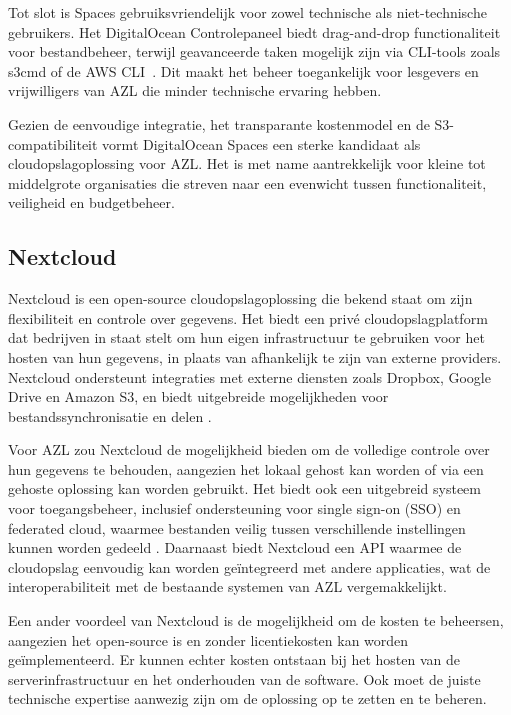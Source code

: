 Tot slot is Spaces gebruiksvriendelijk voor zowel technische als niet-technische gebruikers. Het DigitalOcean Controlepaneel biedt drag-and-drop functionaliteit voor bestandbeheer, terwijl geavanceerde taken mogelijk zijn via CLI-tools zoals s3cmd of de AWS CLI~\cite{do_ui}. Dit maakt het beheer toegankelijk voor lesgevers en vrijwilligers van AZL die minder technische ervaring hebben.

Gezien de eenvoudige integratie, het transparante kostenmodel en de S3-compatibiliteit vormt DigitalOcean Spaces een sterke kandidaat als cloudopslagoplossing voor AZL. Het is met name aantrekkelijk voor kleine tot middelgrote organisaties die streven naar een evenwicht tussen functionaliteit, veiligheid en budgetbeheer.


\subsection{Nextcloud}
Nextcloud is een open-source cloudopslagoplossing die bekend staat om zijn flexibiliteit en controle over gegevens. Het biedt een privé cloudopslagplatform dat bedrijven in staat stelt om hun eigen infrastructuur te gebruiken voor het hosten van hun gegevens, in plaats van afhankelijk te zijn van externe providers. Nextcloud ondersteunt integraties met externe diensten zoals Dropbox, Google Drive en Amazon S3, en biedt uitgebreide mogelijkheden voor bestandssynchronisatie en delen \autocite{nextcloud_features}.

Voor AZL zou Nextcloud de mogelijkheid bieden om de volledige controle over hun gegevens te behouden, aangezien het lokaal gehost kan worden of via een gehoste oplossing kan worden gebruikt. Het biedt ook een uitgebreid systeem voor toegangsbeheer, inclusief ondersteuning voor single sign-on (SSO) en federated cloud, waarmee bestanden veilig tussen verschillende instellingen kunnen worden gedeeld \autocite{nextcloud_sso}. Daarnaast biedt Nextcloud een API waarmee de cloudopslag eenvoudig kan worden geïntegreerd met andere applicaties, wat de interoperabiliteit met de bestaande systemen van AZL vergemakkelijkt.

Een ander voordeel van Nextcloud is de mogelijkheid om de kosten te beheersen, aangezien het open-source is en zonder licentiekosten kan worden geïmplementeerd. Er kunnen echter kosten ontstaan bij het hosten van de serverinfrastructuur en het onderhouden van de software. Ook moet de juiste technische expertise aanwezig zijn om de oplossing op te zetten en te beheren.

